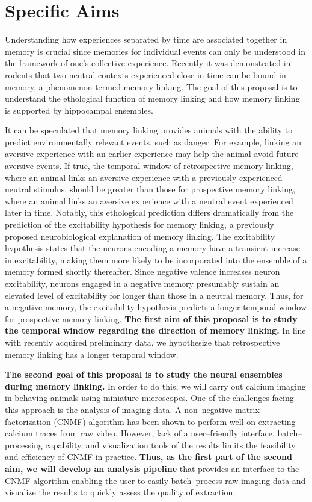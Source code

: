 \documentclass[master.tex]{subfiles}
\begin{document}
\section*{Specific Aims}

Understanding how experiences separated by time are associated together in
memory is crucial since memories for individual events can only be understood in
the framework of one's collective experience. Recently it was demonstrated in
rodents that two neutral contexts experienced close in time can be bound in
memory, a phenomenon termed memory linking. The goal of this proposal is to
understand the ethological function of memory linking and how memory linking is
supported by hippocampal ensembles.

It can be speculated that memory linking provides animals with the ability to
predict environmentally relevant events, such as danger. For example, linking an
aversive experience with an earlier experience may help the animal avoid future
aversive events. If true, the temporal window of retrospective memory linking,
where an animal links an aversive experience with a previously experienced
neutral stimulus, should be greater than those for prospective memory linking,
where an animal links an aversive experience with a neutral event experienced
later in time. Notably, this ethological prediction differs dramatically from
the prediction of the excitability hypothesis for memory linking, a previously
proposed neurobiological explanation of memory linking. The excitability
hypothesis states that the neurons encoding a memory have a transient increase
in excitability, making them more likely to be incorporated into the ensemble of
a memory formed shortly thereafter. Since negative valence increases neuron
excitability, neurons engaged in a negative memory presumably sustain an
elevated level of excitability for longer than those in a neutral memory. Thus,
for a negative memory, the excitability hypothesis predicts a longer temporal
window for prospective memory linking. \textbf{The first aim of this proposal is
  to study the temporal window regarding the direction of memory linking.} In
line with recently acquired preliminary data, we hypothesize that retrospective
memory linking has a longer temporal window.

\textbf{The second goal of this proposal is to study the neural ensembles during
  memory linking.} In order to do this, we will carry out calcium imaging in
behaving animals using miniature microscopes. One of the challenges facing this
approach is the analysis of imaging data. A non--negative matrix factorization
(CNMF) algorithm has been shown to perform well on extracting calcium traces
from raw video. However, lack of a user--friendly interface, batch--processing
capability, and visualization tools of the results limits the feasibility and
efficiency of CNMF in practice. \textbf{Thus, as the first part of the second
  aim, we will develop an analysis pipeline} that provides an interface to the
CNMF algorithm enabling the user to easily batch--process raw imaging data and
visualize the results to quickly assess the quality of extraction.
\end{document}
